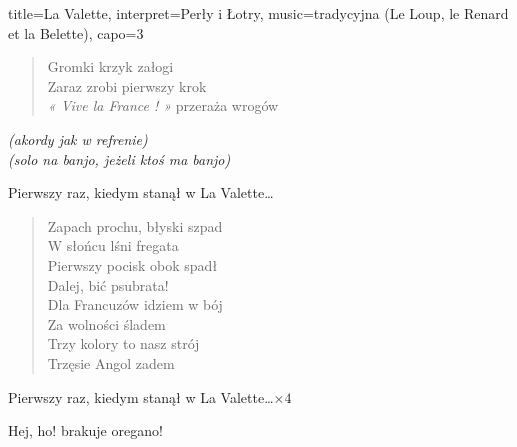 \begin{song}{title={La Valette}, interpret={Perły i Łotry}, music={tradycyjna (Le Loup, le Renard et la Belette)}, capo=3}
\begin{multicols}{2}
\begin{verse}
        Gromki krzyk załogi \\
        Zaraz zrobi pierwszy krok \\
        \textit{« Vive la France ! »} przeraża wrogów
    \end{verse}
    \begin{interlude}
        \textit{(akordy jak w refrenie)} \\
        \textit{(solo na banjo, jeżeli ktoś ma banjo)}
    \end{interlude}
    \begin{chorus}
        Pierwszy raz, kiedym stanął w La Valette\ldots
    \end{chorus}
    \begin{verse}
        Zapach prochu, błyski szpad \\
        W słońcu lśni fregata \\
        Pierwszy pocisk obok spadł \\
        Dalej, bić psubrata! \smallskip \\
        Dla Francuzów idziem w bój \\
        Za wolności śladem \\
        Trzy kolory to nasz strój \\
        Trzęsie Angol zadem
    \end{verse}
    \begin{chorus}
        Pierwszy raz, kiedym stanął w La Valette\ldots $\times 4$
    \end{chorus}
    \begin{outro}
        Hej, ho! brakuje oregano! \\
          
    \end{outro}
    \vfill\null
    \end{multicols}
\end{song}

